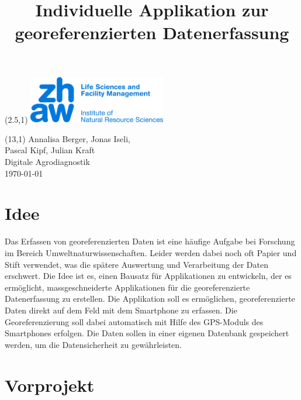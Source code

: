 \documentclass{article}
\title{Individuelle Applikation zur georeferenzierten Datenerfassung}
\makeatletter
\renewcommand{\maketitle}{
  \begin{flushleft} 
    \Large\textmd{\@title} 
    \par
  \end{flushleft}
}
\makeatother
\begin{document}
\begin{textblock}{1}(2.5,1) %
        \includegraphics[width=6cm]{logo.jpg} %
\end{textblock}

\begin{textblock}{6}(13,1) %
        \raggedleft
        Annalisa Berger,
        Jonas Iseli, \\
        Pascal Kipf,
        Julian Kraft\\
        Digitale Agrodiagnostik\\
        \today
\end{textblock}

\vspace*{1.5cm}


\maketitle

\tableofcontents


\section{Idee} %

Das Erfassen von georeferenzierten Daten ist eine häufige Aufgabe bei Forschung im Bereich 
Umweltnaturwissenschaften. Leider werden dabei noch oft Papier und Stift verwendet, was
die spätere Auswertung und Verarbeitung der Daten erschwert. Die Idee ist es, einen Bausatz für Applikationen
zu entwickeln, der es ermöglicht, massgeschneiderte Applikationen für die georeferenzierte Datenerfassung
zu erstellen. Die Applikation soll es ermöglichen, georeferenzierte Daten direkt auf dem Feld mit dem Smartphone
zu erfassen. Die Georeferenzierung soll dabei automatisch mit Hilfe des GPS-Moduls des Smartphones
erfolgen. Die Daten sollen in einer eigenen Datenbank gespeichert werden, um die Datensicherheit zu gewährleisten.

\section{Vorprojekt} %
\end{document}
